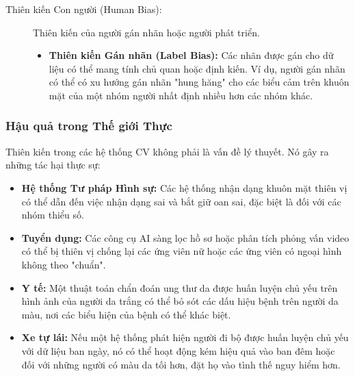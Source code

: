 \begin{description}
    \item[Thiên kiến Con người (Human Bias):] Thiên kiến của người gán nhãn hoặc người phát triển.
        \begin{itemize}
            \item \textbf{Thiên kiến Gán nhãn (Label Bias):} Các nhãn được gán cho dữ liệu có thể mang tính chủ quan hoặc định kiến. Ví dụ, người gán nhãn có thể có xu hướng gán nhãn "hung hăng" cho các biểu cảm trên khuôn mặt của một nhóm người nhất định nhiều hơn các nhóm khác.
        \end{itemize}
\end{description}

\subsubsection{Hậu quả trong Thế giới Thực}
\label{subsubsec:real_world_consequences}
Thiên kiến trong các hệ thống CV không phải là vấn đề lý thuyết. Nó gây ra những tác hại thực sự:
\begin{itemize}
    \item \textbf{Hệ thống Tư pháp Hình sự:} Các hệ thống nhận dạng khuôn mặt thiên vị có thể dẫn đến việc nhận dạng sai và bắt giữ oan sai, đặc biệt là đối với các nhóm thiểu số.
    \item \textbf{Tuyển dụng:} Các công cụ AI sàng lọc hồ sơ hoặc phân tích phỏng vấn video có thể bị thiên vị chống lại các ứng viên nữ hoặc các ứng viên có ngoại hình không theo "chuẩn".
    \item \textbf{Y tế:} Một thuật toán chẩn đoán ung thư da được huấn luyện chủ yếu trên hình ảnh của người da trắng có thể bỏ sót các dấu hiệu bệnh trên người da màu, nơi các biểu hiện của bệnh có thể khác biệt.
    \item \textbf{Xe tự lái:} Nếu một hệ thống phát hiện người đi bộ được huấn luyện chủ yếu với dữ liệu ban ngày, nó có thể hoạt động kém hiệu quả vào ban đêm hoặc đối với những người có màu da tối hơn, đặt họ vào tình thế nguy hiểm hơn.
\end{itemize}

